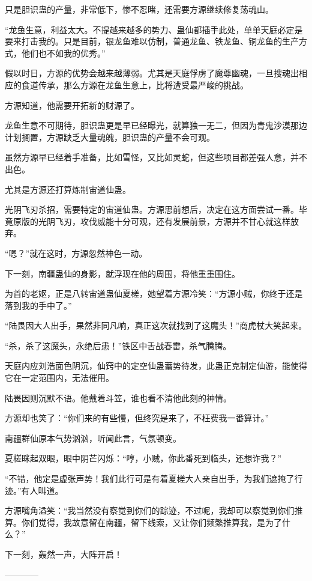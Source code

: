 \begin{this_body}
只是胆识蛊的产量，非常低下，惨不忍睹，还需要方源继续修复荡魂山。

“龙鱼生意，利益太大。不提越来越多的势力、蛊仙都插手此处，单单天庭必定是要来打击我的。只是目前，银龙鱼难以仿制，普通龙鱼、铁龙鱼、铜龙鱼的生产方式，他们也不如我的优秀。”

假以时日，方源的优势会越来越薄弱。尤其是天庭俘虏了魔尊幽魂，一旦搜魂出相应的食道传承，那么方源在龙鱼生意上，比将遭受最严峻的挑战。

方源知道，他需要开拓新的财源了。

龙鱼生意不可期待，胆识蛊更是早已经曝光，就算独一无二，但因为青鬼沙漠那边计划搁置，方源缺乏大量魂魄，胆识蛊的产量不会可观。

虽然方源早已经着手准备，比如雪怪，又比如灵蛇，但这些项目都差强人意，并不出色。

尤其是方源还打算炼制宙道仙蛊。

光阴飞刃杀招，需要特定的宙道仙蛊。方源思前想后，决定在这方面尝试一番。毕竟原版的光阴飞刃，攻伐威能十分可观，还有发展前景，方源并不甘心就这样放弃。

“嗯？”就在这时，方源忽然神色一动。

下一刻，南疆蛊仙的身影，就浮现在他的周围，将他重重围住。

为首的老妪，正是八转宙道蛊仙夏槎，她望着方源冷笑：“方源小贼，你终于还是落到我的手中了。”

“陆畏因大人出手，果然非同凡响，真正这次就找到了这魔头！”商虎杖大笑起来。

“杀，杀了这魔头，永绝后患！”铁区中舌战春雷，杀气腾腾。

天庭内应刘浩面色阴沉，仙窍中的定空仙蛊蓄势待发，此蛊正克制定仙游，能使得它在一定范围内，无法催用。

陆畏因则沉默不语。他戴着斗笠，谁也看不清他此刻的神情。

方源却也笑了：“你们来的有些慢，但终究是来了，不枉费我一番算计。”

南疆群仙原本气势汹汹，听闻此言，气氛顿变。

夏槎眯起双眼，眼中阴芒闪烁：“哼，小贼，你此番死到临头，还想诈我？”

“不错，他定是虚张声势！我们此行可是有着夏槎大人亲自出手，为我们遮掩了行迹。”有人叫道。

方源嘴角溢笑：“我当然没有察觉到你们的踪迹，不过呢，我却可以察觉到你们推算。你们觉得，我故意留在南疆，留下线索，又让你们频繁推算我，是为了什么？”

下一刻，轰然一声，大阵开启！

------------

\end{this_body}

